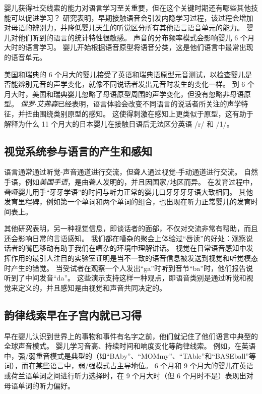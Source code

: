 婴儿获得社交线索的能力对语言学习至关重要，但在这个关键时期还有哪些其他技能可以促进学习？
研究表明，早期接触语音会引发内隐学习过程，该过程会增加对母语的辨别力，并降低婴儿天生的听觉区分所有其他语言语音单元的能力。
婴儿对他们听到的语言的统计特性很敏感。
声音的分布频率模式会影响婴儿 6 个月大时的语言学习。
婴儿开始根据语音原型将语音分类，这是他们语言中最常出现的语音单元。


美国和瑞典的 6 个月大的婴儿接受了英语和瑞典语原型元音测试，以检查婴儿是否能辨别元音的声学变化，就像不同说话者发出元音时发生的变化一样。
到 6 个月大时，美国和瑞典婴儿忽略了母语原型周围的声学变化，但没有忽略非母语原型。
\textit{保罗$\cdot$艾弗森}已经表明，语言体验会改变不同语言的说话者所关注的声学特征，并扭曲围绕类别原型的感知。
这使得刺激在感知上更类似于原型，这有助于解释为什么 11 个月大的日本婴儿在接触日语后无法区分英语 /r/ 和 /1/。



\subsection{视觉系统参与语言的产生和感知}

语言通常通过听觉-声音通道进行交流，但聋人通过视觉-手动通道进行交流。
自然手语，例如\textit{美国手语}，是由聋人发明的，并且因国家/地区而异。
在发育过程中，聋哑婴儿用手“牙牙学语”的时间与听力正常的婴儿口牙牙牙牙语大致相同。
其他发育里程碑，例如第一个单词和两个单词的组合，也出现在听力正常婴儿的发育时间表上。


其他研究表明，另一种视觉信息，即谈话者的面部，不仅对交流非常有帮助，而且还会影响日常的言语感知。
我们都在嘈杂的聚会上体验过“唇读”的好处：观察说话者的嘴巴移动有助于我们在嘈杂的环境中理解讲话。
视觉在日常语音感知中发挥作用的最引人注目的实验室证明是当不一致的语音信息被发送到视觉和听觉模态时产生的错觉。
当受试者在观察一个人发出“ga”时听到音节“ba”时，他们报告说听到了中间发音“da”。
这些演示支持这样一种观点，即语音类别是通过听觉和视觉来定义的，并且感知是由视觉和声音共同决定的。



\subsection{韵律线索早在子宫内就已习得}

早在婴儿认识到世界上的事物和事件有名字之前，他们就记住了他们语言中典型的全球声音模式。
婴儿学习音高、持续时间和响度变化等韵律线索。
例如，在英语中，强/弱重音模式是典型的（如“BAby”、“MOMmy”、“TAble”和“BASEball”等词），而在某些语言中，弱/强模式占主导地位。
6 个月和 9 个月大的婴儿在英语或荷兰语单词之间进行听力选择时，在 9 个月大时（但 6 个月时不是）表现出对母语单词的听力偏好。


